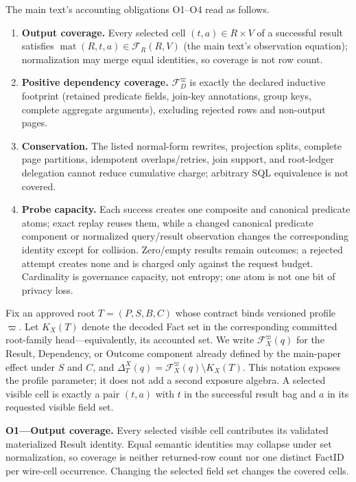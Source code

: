 \documentclass[journal,onecolumn]{IEEEtran}
\newcommand{\facts}{\mathcal F}
\begin{document}
The main text's accounting obligations O1--O4 read as follows.

\begin{enumerate}
\item[\textbf{O1}] \textbf{Output coverage.} Every selected cell
$(t,a)\in R\times V$ of a successful result satisfies
$\operatorname{mat}(R,t,a)\in\facts_R(R,V)$ (the main text's observation equation);
normalization may merge equal identities, so coverage is not row count.
\item[\textbf{O2}] \textbf{Positive dependency coverage.} $\facts_D^\varpi$
is exactly the declared inductive footprint (retained predicate fields,
join-key annotations, group keys, complete aggregate arguments), excluding
rejected rows and non-output pages.
\item[\textbf{O3}] \textbf{Conservation.} The listed normal-form rewrites,
projection splits, complete page partitions, idempotent overlaps/retries, join
support, and root-ledger delegation cannot reduce cumulative charge; arbitrary
SQL equivalence is not covered.
\item[\textbf{O4}] \textbf{Probe capacity.} Each success creates one composite
and canonical predicate atoms; exact replay reuses them, while a changed
canonical predicate component or normalized query/result observation changes the corresponding
identity except for collision. Zero/empty results remain outcomes; a rejected
attempt creates none and is charged only against the request budget.
Cardinality is governance capacity, not entropy; one atom is not one bit of
privacy loss.
\end{enumerate}

Fix an approved root $T=(P,S,B,C)$ whose contract binds versioned profile
$\varpi$. Let $K_X(T)$ denote the decoded Fact set in the corresponding committed
root-family head---equivalently, its accounted set. We write
$\facts_X^\varpi(q)$ for the Result, Dependency, or Outcome
component already defined by the main-paper effect under $S$ and $C$, and
$\Delta_T^X(q)=\facts_X^\varpi(q)\setminus K_X(T)$.  This notation exposes the
profile parameter; it does not add a second exposure algebra.  A selected
visible cell is exactly a pair $(t,a)$ with $t$ in the successful result bag
and $a$ in its requested visible field set.

\textbf{O1---Output coverage.} Every selected visible cell contributes its
validated materialized Result identity. Equal semantic identities may collapse
under set normalization, so coverage is neither returned-row count nor one
distinct FactID per wire-cell occurrence. Changing the selected field set changes the
covered cells.
\end{document}
